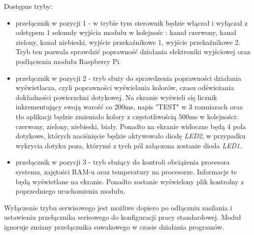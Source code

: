 \documentclass[12pt, eng, twoside, openany, final]{mgr}
\begin{document}
            Dostępne tryby:
            \begin{itemize}
                \item przełącznik w pozycji 1 - w trybie tym sterownik będzie włączał i wyłączał z odstępem 1 sekundy wyjścia modułu w kolejnośc : kanał czerwony, kanał zielony, kanał niebieski, wyjście przekaźnikowe 1, wyjście przekaźnikowe 2. Tryb ten pozwala sprawdzić poprawność działania elektroniki wyjściowej oraz podłączenia modułu Raspberry Pi.
                
                \item przełącznik w pozycji 2 - tryb służy do sprawdzenia poprawności działania wyświetlacza, czyli poprawności wyświelania kolorów, czasu odświeżania dokładności powierzchni dotykowej.
                Na ekranie wyświeli się licznik inkrementujący swoją warość co 200ms, napis "TEST" w 3 rozmiarach oraz tło aplikacji będzie zmieniało kolory z częstotliwością 500ms w kolejności: czerwony, zielony, niebieski, biały. Ponadto na ekranie widoczne będą 4 pola dotykowe, których naciśnięcie będzie aktywowało diodę \emph{LED2}, w przypadku wykrycia dotyku poza, którymś z tych pól załączona zostanie dioda \emph{LED1}. 
                
                \item przełącznik w pozycji 3 - tryb służący do kontroli obciążenia procesora systemu, zajętości RAM-u oraz temperatury na procesorze. Informacje te będą wyświetlane na ekranie. Ponadto zostanie wyświelony plik kontrolny z poprzedniego uruchomienia modułu.
            \end{itemize}
            
            Wyłączenie trybu serwisowego jest możliwe dopiero po odłączniu zasilania i ustawieniu przełącznika serisowego do konfiguracji pracy standardowej.
            Moduł ignoruje zmiany przełącznika suwakowego w czasie działania programów.
            
            \newpage
            
\end{document}

